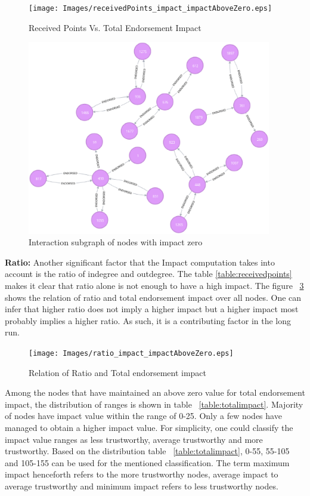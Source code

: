 \begin{figure}
	\texttt{[image: Images/receivedPoints\_impact\_impactAboveZero.eps]}
	\caption{Received Points Vs. Total Endorsement Impact}
	\label{fig:receivedpointvsimpact}
\end{figure}
\begin{figure}
	\includegraphics[width=0.95\textwidth]{Images/nodesWithImpactZero.eps}
	\caption{Interaction subgraph of nodes with impact zero}
	\label{fig:zeroimpact}
\end{figure}
\textbf{Ratio:}
Another significant factor that the Impact computation takes into account is
the ratio of indegree and outdegree. The table \ref{table:receivedpoints} makes
it clear that ratio alone is not enough to have a high impact. The figure
~\ref{fig:ratioimpact} shows the relation of ratio and total endorsement impact
over all nodes. One can infer that higher ratio does not imply a higher impact
but a higher impact most probably implies a higher ratio. As such, it is a
contributing factor in the long run. 
\begin{figure}
	\texttt{[image: Images/ratio\_impact\_impactAboveZero.eps]}
	\caption{Relation of Ratio and Total endorsement impact}
	\label{fig:ratioimpact}
\end{figure}
Among the nodes that have maintained an above zero value for total endorsement
impact, the distribution of ranges is shown in table ~\ref{table:totalimpact}.
Majority of nodes have impact value within the range of 0-25. Only a few nodes
have managed to obtain a higher impact value.  For simplicity, one could
classify the impact value ranges as less trustworthy, average trustworthy and
more trustworthy. Based on the distribution table ~\ref{table:totalimpact},
0-55, 55-105 and 105-155 can be used for the mentioned classification. The term
maximum impact henceforth refers to the more trustworthy nodes, average impact
to average trustworthy and minimum impact refers to less trustworthy nodes. 

